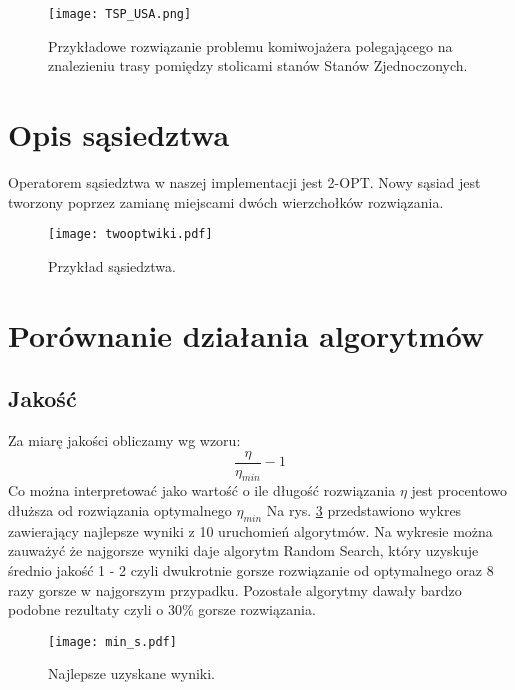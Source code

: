\documentclass{article}
\begin{document}
\begin{figure} 
\begin{center}
\texttt{[image: TSP\_USA.png]}
\end{center}
\caption{Przykładowe rozwiązanie problemu komiwojażera polegającego na znalezieniu trasy pomiędzy stolicami stanów Stanów Zjednoczonych.}
\label{fig:schemat}
\end{figure}


\section{Opis sąsiedztwa}

Operatorem sąsiedztwa w naszej implementacji jest 2-OPT. Nowy sąsiad jest tworzony poprzez zamianę miejscami dwóch wierzchołków rozwiązania. 

\begin{figure} 
\begin{center}
\texttt{[image: twooptwiki.pdf]}
\end{center}
\caption{Przykład sąsiedztwa.}
\label{fig:schemat}
\end{figure}


\section{Porównanie działania algorytmów}


\subsection{Jakość}
Za miarę jakości obliczamy wg wzoru:
$$ \frac{\eta}{\eta_{min}}-1 $$
Co można interpretować jako wartość o ile długość rozwiązania $\eta$ jest procentowo dłuższa od rozwiązania optymalnego $\eta_{min}$
Na  rys. \ref{fig:plot_min} przedstawiono wykres zawierający najlepsze wyniki z 10 uruchomień algorytmów. Na wykresie można zauważyć że najgorsze wyniki daje algorytm Random Search, który uzyskuje średnio jakość 1 - 2 czyli dwukrotnie gorsze rozwiązanie od optymalnego oraz 8 razy gorsze w najgorszym przypadku. Pozostałe algorytmy dawały bardzo podobne rezultaty czyli o 30\% gorsze rozwiązania.

\begin{figure} 
\begin{center}
\texttt{[image: min\_s.pdf]}
\end{center}
\caption{Najlepsze uzyskane wyniki.}
\label{fig:plot_min}
\end{figure}
\end{document}
